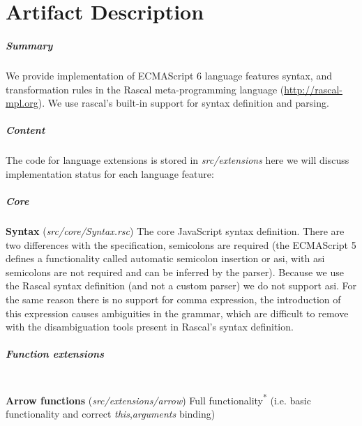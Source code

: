 
\chapter{Artifact Description} %

\label{AppendixA} %


\paragraph{Summary}
We provide implementation of ECMAScript 6 language features syntax, and transformation rules in the Rascal meta-programming language (\url{http://rascal-mpl.org}). We use rascal's built-in support for syntax definition and parsing.

\paragraph{Content}
The code for language extensions is stored in \textit{src/extensions} here we will discuss implementation status for each language feature:

\paragraph{Core}
\textbf{Syntax} (\textit{src/core/Syntax.rsc}) \newline
The core JavaScript syntax definition. There are two differences with the specification, semicolons are required (the ECMAScript 5 defines a functionality called automatic semicolon insertion or asi, with asi semicolons are not required and can be inferred by the parser). Because we use the Rascal syntax definition (and not a custom parser) we do not support asi. For the same reason there is no support for comma expression, the introduction of this expression causes ambiguities in the grammar, which are difficult to remove with the disambiguation tools present in Rascal's syntax definition.

\paragraph{Function extensions}\mbox{}\\
\textbf{Arrow functions} (\textit{src/extensions/arrow}) \newline
Full functionality\textsuperscript{*} (i.e. basic functionality and correct \textit{this},\textit{arguments} binding)


